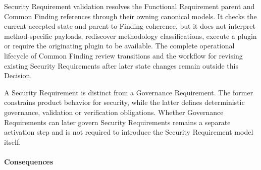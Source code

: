 \documentclass[
  10pt,
]{article}
\begin{document}
Security Requirement validation resolves the Functional Requirement
parent and Common Finding references through their owning canonical
models. It checks the current accepted state and parent-to-Finding
coherence, but it does not interpret method-specific payloads,
rediscover methodology classifications, execute a plugin or require the
originating plugin to be available. The complete operational lifecycle
of Common Finding review transitions and the workflow for revising
existing Security Requirements after later state changes remain outside
this Decision.

A Security Requirement is distinct from a Governance Requirement. The
former constrains product behavior for security, while the latter
defines deterministic governance, validation or verification
obligations. Whether Governance Requirements can later govern Security
Requirements remains a separate activation step and is not required to
introduce the Security Requirement model itself.

\paragraph{Consequences}\label{consequences-14}
\end{document}
